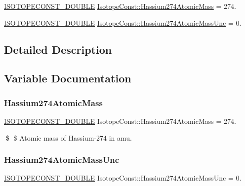 \begin{DoxyCompactItemize}
\item 
\mbox{\hyperlink{group___isotope_const-_macros_ga8f45a7272ce02c0b4c65c44636ed719a}{I\+S\+O\+T\+O\+P\+E\+C\+O\+N\+S\+T\+\_\+\+D\+O\+U\+B\+LE}} \mbox{\hyperlink{group___isotope_const-_hassium-_hs274_gaa2b11390393cf0f82f091ad8d7e94306}{Isotope\+Const\+::\+Hassium274\+Atomic\+Mass}} = 274.
\item 
\mbox{\hyperlink{group___isotope_const-_macros_ga8f45a7272ce02c0b4c65c44636ed719a}{I\+S\+O\+T\+O\+P\+E\+C\+O\+N\+S\+T\+\_\+\+D\+O\+U\+B\+LE}} \mbox{\hyperlink{group___isotope_const-_hassium-_hs274_ga032010b1bbffcccada3aeef75d55d16d}{Isotope\+Const\+::\+Hassium274\+Atomic\+Mass\+Unc}} = 0.
\end{DoxyCompactItemize}


\subsection{Detailed Description}


\subsection{Variable Documentation}
\mbox{\label{group___isotope_const-_hassium-_hs274_gaa2b11390393cf0f82f091ad8d7e94306}} 
\subsubsection{\texorpdfstring{Hassium274\+Atomic\+Mass}{Hassium274AtomicMass}}
{\footnotesize\ttfamily \mbox{\hyperlink{group___isotope_const-_macros_ga8f45a7272ce02c0b4c65c44636ed719a}{I\+S\+O\+T\+O\+P\+E\+C\+O\+N\+S\+T\+\_\+\+D\+O\+U\+B\+LE}} Isotope\+Const\+::\+Hassium274\+Atomic\+Mass = 274.}

\$ \$ Atomic mass of Hassium-\/274 in amu. \mbox{\label{group___isotope_const-_hassium-_hs274_ga032010b1bbffcccada3aeef75d55d16d}} 
\subsubsection{\texorpdfstring{Hassium274\+Atomic\+Mass\+Unc}{Hassium274AtomicMassUnc}}
{\footnotesize\ttfamily \mbox{\hyperlink{group___isotope_const-_macros_ga8f45a7272ce02c0b4c65c44636ed719a}{I\+S\+O\+T\+O\+P\+E\+C\+O\+N\+S\+T\+\_\+\+D\+O\+U\+B\+LE}} Isotope\+Const\+::\+Hassium274\+Atomic\+Mass\+Unc = 0.}

